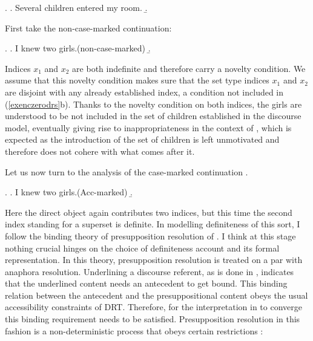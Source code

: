 \documentclass[11pt,a4paper]{article}
\begin{document}
\ex.\label{exencmaindrs}
\a. Several children entered my room.
\b. 

First take the non-case-marked continuation:

\ex.\label{exenczerodrs}
\a. I knew two girls.\hfill (non-case-marked)
\b.

Indices $x_1$ and $x_2$ are both indefinite and therefore carry a
novelty condition. We assume that this novelty condition makes sure
that the set type indices $x_1$ and $x_2$ are disjoint with any
already established index, a condition not included in
(\ref{exenczerodrs}b).  Thanks to the novelty condition on both
indices, the girls are understood to be not included in the set of
children established in the discourse model, eventually giving rise to
inappropriateness in the context of , which is
expected as the introduction of the set of children is left
unmotivated and therefore does not cohere with what comes after it.

Let us now turn to the analysis of the case-marked continuation
.

\ex.\label{exencacc1}
\a. I knew two girls.\hfill (Acc-marked)
\b. 

Here the direct object  again contributes two
indices, but this time the second index standing for a superset is definite. In
modelling definiteness of this sort, I follow the binding theory of
presupposition resolution of . I think at this stage nothing
crucial hinges on the choice of definiteness account and its formal
representation. In this theory, presupposition resolution is treated on a par
with anaphora resolution. Underlining a discourse referent, as is done in
, indicates that the underlined content needs an antecedent to
get bound. This binding relation between the antecedent and the
presuppositional content obeys the usual accessibility constraints of DRT.
Therefore, for the interpretation in  to converge this binding
requirement needs to be satisfied. Presupposition resolution in this fashion is
a non-deterministic process that obeys certain restrictions
:
\end{document}
